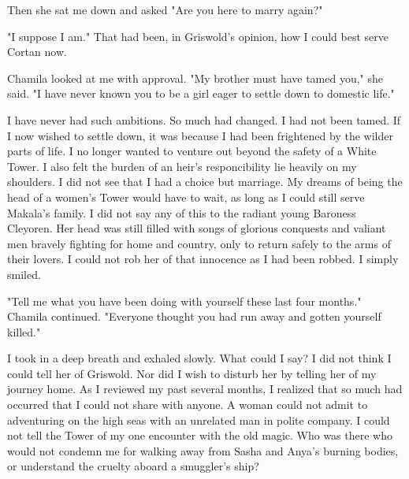 \documentclass{article}
\begin{document}
Then she sat me down and asked "Are you here to marry again?"

"I suppose I am." That had been, in Griswold's opinion, how I could best serve Cortan now. 

Chamila looked at me with approval. "My brother must have tamed you," she said. "I have never known you to be a girl eager to settle down to domestic life."

I have never had such ambitions. So much had changed. I had not been tamed. If I now wished to settle down, it was because I had been frightened by the wilder parts of life. I no longer wanted to venture out beyond the safety of a White Tower. I also felt the burden of an heir's responcibility lie heavily on my shoulders. I did not see that I had a choice but marriage. My dreams of being the head of a women's Tower would have to wait, as long as I could still serve Makala's family. I did not say any of this to the radiant young Baroness Cleyoren. Her head was still filled with songs of glorious conquests and valiant men bravely fighting for home and country, only to return safely to the arms of their lovers. I could not rob her of that innocence as I had been robbed. I simply smiled.

"Tell me what you have been doing with yourself these last four months." Chamila continued. "Everyone thought you had run away and gotten yourself killed."

I took in a deep breath and exhaled slowly. What could I say? I did not think I could tell her of Griswold. Nor did I wish to disturb her by telling her of my journey home. As I reviewed my past several months, I realized that so much had occurred that I could not share with anyone. A woman could not admit to adventuring on the high seas with an unrelated man in polite company. I could not tell the Tower of my one encounter with the old magic. Who was there who would not condemn me for walking away from Sasha and Anya's burning bodies, or understand the cruelty aboard a smuggler's ship? 
\end{document}
